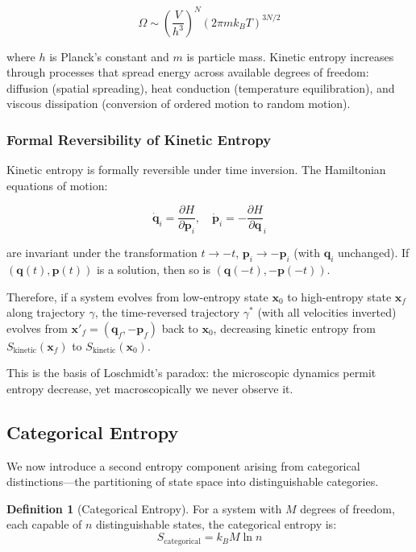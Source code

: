 \documentclass[twocolumn,10pt]{article}
\theoremstyle{definition}
\newtheorem{definition}[theorem]{Definition}
\theoremstyle{remark}
\begin{document}
$$
\Omega \sim \left(\frac{V}{h^3}\right)^N (2\pi m k_B T)^{3N/2}
$$

where $h$ is Planck's constant and $m$ is particle mass. Kinetic entropy increases through processes that spread energy across available degrees of freedom: diffusion (spatial spreading), heat conduction (temperature equilibration), and viscous dissipation (conversion of ordered motion to random motion).

\subsubsection{Formal Reversibility of Kinetic Entropy}

Kinetic entropy is formally reversible under time inversion. The Hamiltonian equations of motion:

$$
\dot{\mathbf{q}}_i = \frac{\partial H}{\partial \mathbf{p}_i}, \quad \dot{\mathbf{p}}_i = -\frac{\partial H}{\partial \mathbf{q}}_i
$$

are invariant under the transformation $t \to -t$, $\mathbf{p}_i \to -\mathbf{p}_i$ (with $\mathbf{q}_i$ unchanged). If $(\mathbf{q}(t), \mathbf{p}(t))$ is a solution, then so is $(\mathbf{q}(-t), -\mathbf{p}(-t))$.

Therefore, if a system evolves from low-entropy state $\mathbf{x}_0$ to high-entropy state $\mathbf{x}_f$ along trajectory $\gamma$, the time-reversed trajectory $\gamma^*$ (with all velocities inverted) evolves from $\mathbf{x}'_f = (\mathbf{q}_f, -\mathbf{p}_f)$ back to $\mathbf{x}_0$, decreasing kinetic entropy from $S_{\text{kinetic}}(\mathbf{x}_f)$ to $S_{\text{kinetic}}(\mathbf{x}_0)$.

This is the basis of Loschmidt's paradox: the microscopic dynamics permit entropy decrease, yet macroscopically we never observe it.

\subsection{Categorical Entropy}

We now introduce a second entropy component arising from categorical distinctions—the partitioning of state space into distinguishable categories.

\begin{definition}[Categorical Entropy]
For a system with $M$ degrees of freedom, each capable of $n$ distinguishable states, the categorical entropy is:
$$
S_{\text{categorical}} = k_B M \ln n
$$
\end{definition}
\end{document}
